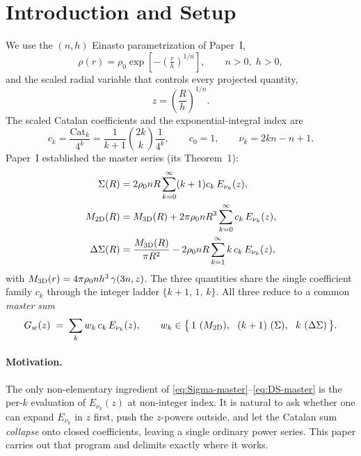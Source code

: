\documentclass{article}
\begin{document}
\section{Introduction and Setup}
\label{sec:intro}

We use the $(n,h)$ Einasto parametrization of Paper~I,
\begin{equation}\label{eq:einasto}
\rho(r)=\rho_0\exp\!\left[-\left(\tfrac{r}{h}\right)^{1/n}\right],
\qquad n>0,\;h>0,
\end{equation}
and the scaled radial variable that controls every projected quantity,
\begin{equation}\label{eq:zdef}
z=\left(\frac{R}{h}\right)^{1/n}.
\end{equation}
The scaled Catalan coefficients and the exponential-integral index are
\begin{equation}\label{eq:ck}
c_k=\frac{\mathrm{Cat}_k}{4^k}
   =\frac{1}{k+1}\binom{2k}{k}\frac1{4^k},\qquad c_0=1,
\qquad
\nu_k=2kn-n+1 .
\end{equation}
Paper~I established the master series (its Theorem~1):
\begin{align}
\Sigma(R) &= 2\rho_0 nR\sum_{k=0}^{\infty}(k+1)c_k\,E_{\nu_k}(z),
\label{eq:Sigma-master}\\
M_{\rm 2D}(R) &= M_{\rm 3D}(R)+2\pi\rho_0 nR^3\sum_{k=0}^{\infty}c_k\,E_{\nu_k}(z),
\label{eq:M2D-master}\\
\Delta\Sigma(R) &= \frac{M_{\rm 3D}(R)}{\pi R^2}
   -2\rho_0 nR\sum_{k=1}^{\infty}k\,c_k\,E_{\nu_k}(z),
\label{eq:DS-master}
\end{align}
with $M_{\rm 3D}(r)=4\pi\rho_0 nh^3\,\gamma(3n,z)$.  The three quantities share
the single coefficient family $c_k$ through the integer ladder
$\{k+1,\,1,\,k\}$.  All three reduce to a common \emph{master sum}
\begin{equation}\label{eq:Gw}
G_w(z)\;=\;\sum_{k}w_k\,c_k\,E_{\nu_k}(z),
\qquad
w_k\in\bigl\{\,1\ (M_{\rm 2D}),\ \ (k+1)\ (\Sigma),\ \ k\ (\Delta\Sigma)\,\bigr\}.
\end{equation}

\paragraph{Motivation.}
The only non-elementary ingredient of \eqref{eq:Sigma-master}--\eqref{eq:DS-master}
is the per-$k$ evaluation of $E_{\nu_k}(z)$ at non-integer index.  It is natural
to ask whether one can expand $E_{\nu_k}$ in $z$ first, push the $z$-powers
outside, and let the Catalan sum \emph{collapse} onto closed coefficients,
leaving a single ordinary power series.  This paper carries out that program and
delimits exactly where it works.
\end{document}
